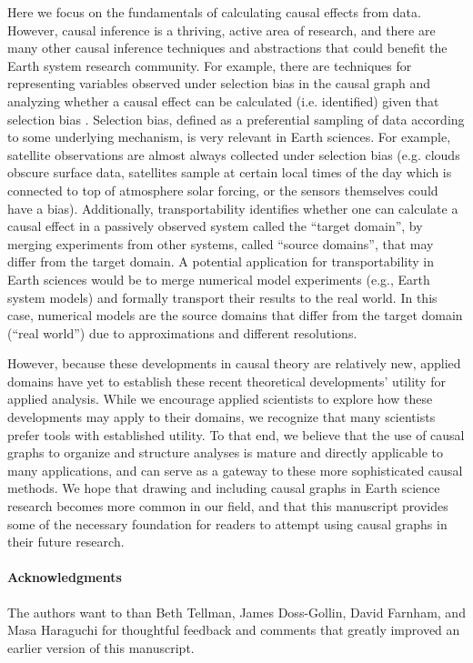 \documentclass[12pt]{article}
\begin{document}
Here we focus on the fundamentals of calculating causal effects from
data. However, causal inference is a thriving, active area of
research, and there are many other causal inference techniques and
abstractions that could benefit the Earth system research
community. For example, there are techniques for representing
variables observed under selection bias in the causal graph and
analyzing whether a causal effect can be calculated (i.e. identified)
given that selection bias
\citep[e.g.,][]{bareinboim2014recovering,correa2018generalized}. Selection
bias, defined as a preferential sampling of data according to some
underlying mechanism, is very relevant in Earth sciences. For example,
satellite observations are almost always collected under selection
bias (e.g. clouds obscure surface data, satellites sample at certain
local times of the day which is connected to top of atmosphere solar
forcing, or the sensors themselves could have a bias). Additionally,
transportability
\citep[e.g.,][]{bareinboim2012transportability,Bareinboim7345,lee2019general}
identifies whether one can calculate a causal effect in a passively
observed system called the ``target domain'', by merging experiments
from other systems, called ``source domains'', that may differ from
the target domain. A potential application for transportability in
Earth sciences would be to merge numerical model experiments (e.g.,
Earth system models) and formally transport their results to the real
world. In this case, numerical models are the source domains that
differ from the target domain (``real world'') due to approximations
and different resolutions.

However, because these developments in causal theory are relatively
new, applied domains have yet to establish these recent theoretical
developments' utility for applied analysis. While we encourage applied
scientists to explore how these developments may apply to their
domains, we recognize that many scientists prefer tools with
established utility. To that end, we believe that the use of causal
graphs to organize and structure analyses is mature and directly
applicable to many applications, and can serve as a gateway to these
more sophisticated causal methods. We hope that drawing and including
causal graphs in Earth science research becomes more common in our
field, and that this manuscript provides some of the necessary
foundation for readers to attempt using causal graphs in
their future research.

\paragraph{Acknowledgments} The authors want to than Beth Tellman,
James Doss-Gollin, David Farnham, and Masa Haraguchi for thoughtful
feedback and comments that greatly improved an earlier version of this
manuscript.
\end{document}
